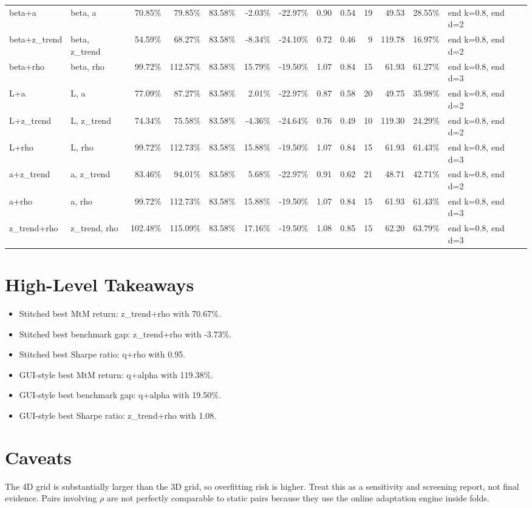 \documentclass[10pt]{article}
\begin{document}
\begin{longtable}{p{0.9in}p{1.15in}rrrrrrrrrrp{1.1in}}
beta+a & beta, a & 70.85\% & 79.85\% & 83.58\% & -2.03\% & -22.97\% & 0.90 & 0.54 & 19 & 49.53 & 28.55\% & end k=0.8, end d=2 \\
beta+z\_trend & beta, z\_trend & 54.59\% & 68.27\% & 83.58\% & -8.34\% & -24.10\% & 0.72 & 0.46 & 9 & 119.78 & 16.97\% & end k=0.8, end d=2 \\
beta+rho & beta, rho & 99.72\% & 112.57\% & 83.58\% & 15.79\% & -19.50\% & 1.07 & 0.84 & 15 & 61.93 & 61.27\% & end k=0.8, end d=3 \\
L+a & L, a & 77.09\% & 87.27\% & 83.58\% & 2.01\% & -22.97\% & 0.87 & 0.58 & 20 & 49.75 & 35.98\% & end k=0.8, end d=2 \\
L+z\_trend & L, z\_trend & 74.34\% & 75.58\% & 83.58\% & -4.36\% & -24.64\% & 0.76 & 0.49 & 10 & 119.30 & 24.29\% & end k=0.8, end d=2 \\
L+rho & L, rho & 99.72\% & 112.73\% & 83.58\% & 15.88\% & -19.50\% & 1.07 & 0.84 & 15 & 61.93 & 61.43\% & end k=0.8, end d=3 \\
a+z\_trend & a, z\_trend & 83.46\% & 94.01\% & 83.58\% & 5.68\% & -22.97\% & 0.91 & 0.62 & 21 & 48.71 & 42.71\% & end k=0.8, end d=2 \\
a+rho & a, rho & 99.72\% & 112.73\% & 83.58\% & 15.88\% & -19.50\% & 1.07 & 0.84 & 15 & 61.93 & 61.43\% & end k=0.8, end d=3 \\
z\_trend+rho & z\_trend, rho & 102.48\% & 115.09\% & 83.58\% & 17.16\% & -19.50\% & 1.08 & 0.85 & 15 & 62.20 & 63.79\% & end k=0.8, end d=3 \\
\bottomrule
\end{longtable}
\normalsize

\section*{High-Level Takeaways}
\begin{itemize}
    \item Stitched best MtM return: z\_trend+rho with 70.67\%.
    \item Stitched best benchmark gap: z\_trend+rho with -3.73\%.
    \item Stitched best Sharpe ratio: q+rho with 0.95.
    \item GUI-style best MtM return: q+alpha with 119.38\%.
    \item GUI-style best benchmark gap: q+alpha with 19.50\%.
    \item GUI-style best Sharpe ratio: z\_trend+rho with 1.08.
\end{itemize}

\section*{Caveats}
The 4D grid is substantially larger than the 3D grid, so overfitting risk is
higher. Treat this as a sensitivity and screening report, not final evidence.
Pairs involving $\rho$ are not perfectly comparable to static pairs because
they use the online adaptation engine inside folds.
\end{document}

